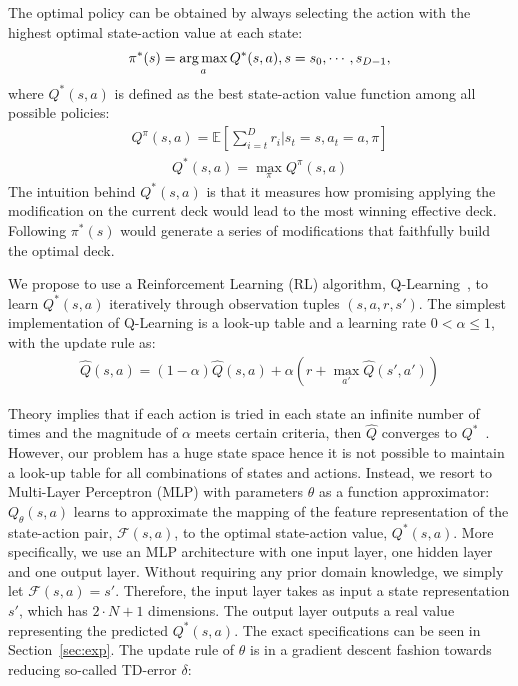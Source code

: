 The optimal policy can be obtained by always selecting the action with the highest optimal state-action value at each state:
\begin{align}
    \pi^*(s) = \operatorname*{arg\,max}_a Q^*(s,a),  s = s_0, \cdots, s_{D-1},
\label{eqn:optpolicy}
\end{align}
where $Q^*(s,a)$ is defined as the best state-action value function among all possible policies:
\begin{align}
Q^\pi(s,a)=\mathbb{E}[\sum_{i=t}^{D} r_i | s_t=s, a_t=a, \pi] 
\end{align}
\begin{align}
Q^*(s,a)=\max_\pi Q^\pi(s,a) 
\end{align}
The intuition behind $Q^*(s,a)$ is that it measures how promising applying the modification on the current deck would lead to the most winning effective deck. Following $\pi^*(s)$ would generate a series of modifications that faithfully build the optimal deck. 

We propose to use a Reinforcement Learning (RL) algorithm, Q-Learning~\cite{watkins1992q}, to learn $Q^*(s,a)$ iteratively through observation tuples $(s,a,r,s')$. The simplest implementation of Q-Learning is a look-up table and a learning rate $0 < \alpha \leq 1$, with the update rule as: 
\begin{align}
\hat{Q}(s,a) = (1 - \alpha) \hat{Q}(s,a) + \alpha (r + \max_{a'} \hat{Q}(s', a')) 
\label{eqn:qsa}
\end{align}

Theory implies that if each action is tried in each state an infinite number of times and the magnitude of $\alpha$ meets certain criteria, then $\hat{Q}$ converges to $Q^*$~\cite{bertsekas1989parallel}. However, our problem has a huge state space hence it is not possible to maintain a look-up table for all combinations of states and actions. Instead, we resort to Multi-Layer Perceptron (MLP) with parameters $\theta$ as a function approximator: $Q_\theta(s,a)$ learns to approximate the mapping of the feature representation of the state-action pair, $\mathcal{F}(s,a)$, to the optimal state-action value, $Q^*(s,a)$. More specifically, we use an MLP architecture with one input layer, one hidden layer and one output layer. Without requiring any prior domain knowledge, we simply let $\mathcal{F}(s,a)=s'$. Therefore, the input layer takes as input a state representation $s'$, which has ${2\cdot N+1}$ dimensions. The output layer outputs a real value  representing the predicted $Q^*(s,a)$. The exact specifications can be seen in Section~\ref{sec:exp}. The update rule of $\theta$ is in a gradient descent fashion towards reducing so-called TD-error $\delta$:

